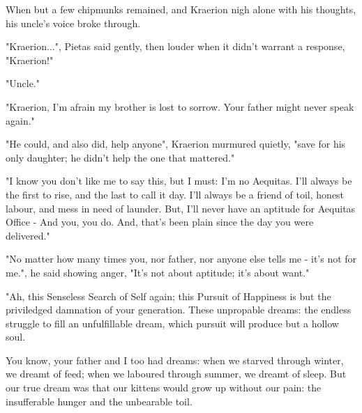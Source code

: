 When but a few chipmunks remained, and Kraerion nigh alone with his thoughts, his uncle's voice broke through.

"Kraerion...", Pietas said gently, then louder when it didn't warrant a response, "Kraerion!"

"Uncle."



"Kraerion, I'm afrain my brother is lost to sorrow. Your father might never speak again."


"He could, and also did, help anyone", Kraerion murmured quietly, "save for his only daughter; he didn't help the one that mattered."

"I know you don't like me to say this, but I must: I'm no Aequitas.
I'll always be the first to rise, and the last to call it day.
I'll always be a friend of toil, honest labour, and mess in need of launder.
But, I'll never have an aptitude for Aequitas Office - And you, you do. And, that's been plain since the day you were delivered."


"No matter how many times you, nor father, nor anyone else tells me - it's not for me.", he said showing anger, "It's not about aptitude; it's about want."

"Ah, this Senseless Search of Self again; this Pursuit of Happiness is but the priviledged damnation of your generation. These unpropable dreams: the endless struggle to fill an unfulfillable dream, which pursuit will produce but a hollow soul.
	
	You know, your father and I too had dreams: when we starved through winter, we dreamt of feed; when we laboured through summer, we dreamt of sleep. But our true dream was that our kittens would grow up without our pain: the insufferable hunger and the unbearable toil.

